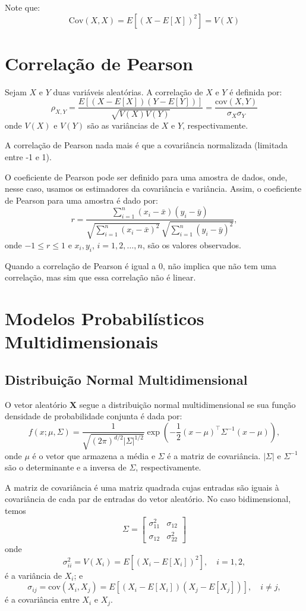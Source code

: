 \documentclass{article}
\begin{document}
Note que:
    $$
    \mathrm{Cov}(X, X) = E\left[(X - E\left[X\right])^2\right] = V(X)
    $$

\section{Correlação de Pearson}
Sejam $X$ e $Y$ duas variáveis aleatórias. A correlação de $X$ e $Y$ é definida por:
    $$
    \rho_{X,Y} =
    \frac{E[(X - E[X])(Y - E[Y])]}{\sqrt{V(X)V(Y)}} =
    \frac{\mathrm{cov}(X, Y)}{\sigma_X \sigma_Y}
    $$
onde $V(X)$ e $V(Y)$ são as variâncias de $X$ e $Y$, respectivamente.

A correlação de Pearson nada mais é que a covariância normalizada (limitada entre -1 e 1).

O coeficiente de Pearson pode ser definido para uma amostra de dados, onde, nesse caso, usamos os estimadores da covariância e variância.
Assim, o coeficiente de Pearson para uma amostra é dado por:
    $$
    r = \frac{\sum_{i=1}^{n} (x_i - \bar{x})(y_i - \bar{y})}
    {\sqrt{\sum_{i=1}^{n} (x_i - \bar{x})^2} \, \sqrt{\sum_{i=1}^{n} (y_i - \bar{y})^2}},
    $$
onde $-1 \leq r \leq 1$ e $x_i, y_i$, $i = 1, 2, \ldots, n$, são os valores observados.

Quando a correlação de Pearson é igual a 0, não implica que não tem uma correlação, mas sim que essa correlação não é linear.

\section{Modelos Probabilísticos Multidimensionais}
\subsection{Distribuição Normal Multidimensional}

O vetor aleatório $\mathbf{X}$ segue a distribuição normal multidimensional se sua função densidade de probabilidade conjunta é dada por:
    $$
    f(x; \mu, \Sigma) =
    \frac{1}{\sqrt{(2\pi)^{d/2}|\Sigma|^{1/2}}}
    \exp\left( -\frac{1}{2}(x - \mu)^\top \Sigma^{-1} (x - \mu) \right),
    $$
onde $\mu$ é o vetor que armazena a média e $\Sigma$ é a matriz de covariância.
$|\Sigma|$ e $\Sigma^{-1}$ são o determinante e a inversa de $\Sigma$, respectivamente.

A matriz de covariância é uma matriz quadrada cujas entradas são iguais à covariância de cada par de entradas do vetor aleatório.
No caso bidimensional, temos
    $$
    \Sigma =
    \begin{bmatrix}
    \sigma_{11}^2 & \sigma_{12} \\
    \sigma_{12} & \sigma_{22}^2
    \end{bmatrix}
    $$
onde
    $$
    \sigma_{ii}^2 = V(X_i) = E\left[(X_i - E[X_i])^2\right], \quad i = 1,2,
    $$
é a variância de $X_i$; e
    $$
    \sigma_{ij} = \mathrm{cov}(X_i, X_j) = E\left[(X_i - E[X_i])(X_j - E[X_j])\right], \quad i \neq j,
    $$
é a covariância entre $X_i$ e $X_j$.
\end{document}
